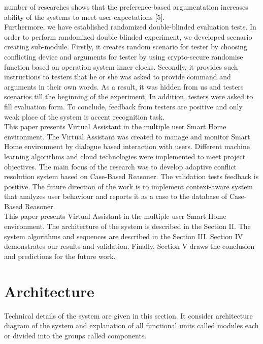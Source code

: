 \documentclass{llncs}
\begin{document}
    number of researches shows that the preference-based argumentation increases ability of the systems to meet user
    expectations [5].\\
    Furthermore, we have established randomized double-blinded evaluation tests. In order to perform randomized double
    blinded experiment, we developed scenario creating sub-module. Firstly, it creates random scenario for tester by choosing
    conflicting device and arguments for tester by using crypto-secure randomise function based on operation system inner
    clocks. Secondly, it provides such instructions to testers that he or she was
    asked to provide command and arguments in their own words. As a result, it was hidden from us and testers scenarios till
    the beginning of the experiment. In addition, testers were asked to fill evaluation form. To conclude, feedback from
    testers are positive and only weak place of the system is accent recognition task.\\
    This paper presents Virtual Assistant in the multiple user Smart Home environment. The Virtual Assistant was created
    to manage and monitor Smart Home environment by dialogue based interaction with users. Different machine learning
    algorithms and cloud technologies were implemented to meet project objectives. The main focus of the research was to
    develop adaptive conflict resolution system based on Case-Based Reasoner. The validation tests feedback is positive.
    The future direction of the work is to implement context-aware system that analyzes user behaviour and reports it as
    a case to the database of Case-Based Reasoner.\\
    This paper presents Virtual Assistant in the multiple user Smart Home environment. The architecture of the system is
    described in the Section II. The system algorithms and sequences are described in the Section III. Section IV demonstrates
    our results and validation. Finally, Section V draws the conclusion and predictions for the future work.
    \section{Architecture}
    Technical details of the system are given in this section.
    It consider architecture diagram of the system and explanation of all functional units called modules each
    or divided into the groups called components.
\end{document}
